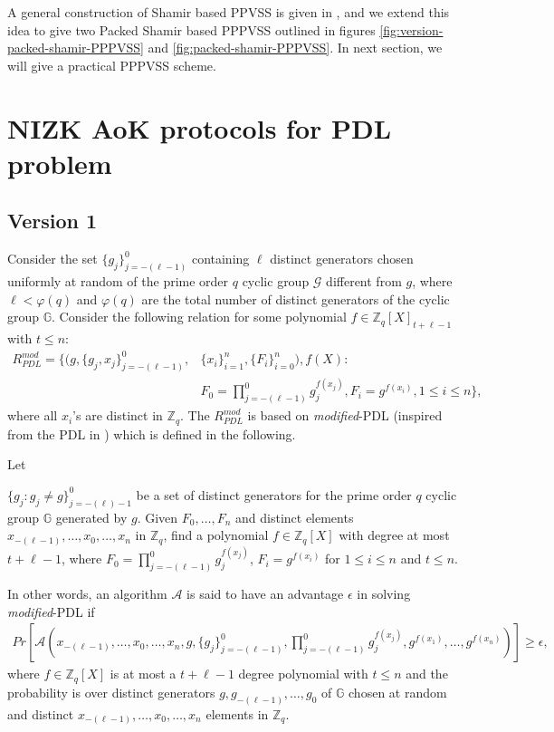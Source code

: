 A general construction of Shamir based PPVSS is given in \cite{cryptoeprint:2025/576}, and we extend this idea 
to give two Packed Shamir based PPPVSS outlined in figures \ref{fig:version-packed-shamir-PPPVSS} and \ref{fig:packed-shamir-PPPVSS}. 
In next section, we will give a practical PPPVSS scheme.




\section{NIZK AoK protocols for PDL problem}
\label{sec:aok_polynomial_dl}
\subsection{Version 1}
\label{subsec:v0}
Consider the set $\{g_j\}_{j=-(\ell-1)}^0$ containing $\ell$ distinct generators chosen uniformly at random of 
the prime order $q$ cyclic group $\mathcal{G}$ different from $g$, where $\ell<\varphi(q)$ and $\varphi(q)$ are 
the total number of distinct generators of the cyclic group $\mathbb{G}$. Consider the following relation for 
some polynomial $f\in\mathbb{Z}_q[X]_{t+\ell-1}$ with $t\leq n$:
\begin{align}\label{eq:relation_mod_PDL}
  R_{PDL}^{mod} = \{(g,\{g_j,x_j\}_{j=-(\ell-1)}^0,&\{x_i\}_{i=1}^n,\{F_i\}_{i=0}^n),f(X) :\nonumber\\
   &F_0=\prod_{j=-(\ell-1)}^{0}g_j^{f(x_j)}, F_i=g^{f(x_i)}, 1\leq i\leq n\},
\end{align}
where all $x_i$'s are distinct in $\mathbb{Z}_q$. The $R_{PDL}^{mod}$ is based on \textit{modified}-PDL (inspired from the PDL in \cite{cryptoeprint:2023/1669}) 
which is defined in the following.

\begin{definition}
  Let\par 
  $\{g_j : g_j\neq g\}_{j=-(\ell)-1}^0$ be a set of distinct generators for the prime order $q$ cyclic 
  group $\mathbb{G}$ generated by $g$. Given $F_0,\dots,F_n$ and distinct elements $x_{-(\ell-1)},\dots,x_0,\dots,x_n$ in 
  $\mathbb{Z}_q$, find a polynomial $f\in\mathbb{Z}_q[X]$ with degree at most $t+\ell-1$, where $F_0=\prod_{j=-(\ell-1)}^{0}g_j^{f(x_j)}$, 
  $F_i=g^{f(x_i)}$ for $1\leq i\leq n$ and $t\leq n$.\par

  In other words, an algorithm $\mathcal{A}$ is said to have an advantage $\epsilon$ in solving \textit{modified}-PDL if 
  \begin{align*}
    Pr[\mathcal{A}(x_{-(\ell-1)},\dots,x_0,\dots,x_n,g,\{g_j\}_{j=-(\ell-1)}^0,\prod_{j=-(\ell-1)}^{0}g_j^{f(x_j)},g^{f(x_1)},\dots,g^{f(x_n)})]\geq\epsilon,
  \end{align*}
  where $f\in\mathbb{Z}_q[X]$ is at most a $t+\ell-1$ degree polynomial with $t\leq n$ and the probability is over 
  distinct generators $g,g_{-(\ell-1)},\dots,g_0$ of $\mathbb{G}$ chosen at random and distinct $x_{-(\ell-1)},\dots,x_0,\dots,x_n$ 
  elements in $\mathbb{Z}_q$.
\end{definition}

